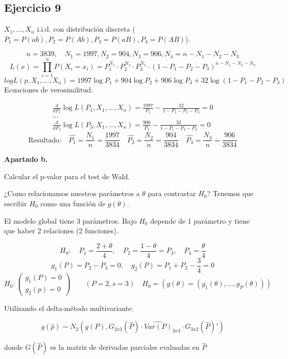 \subsection*{Ejercicio 9}

$X_1,\dots,X_n$ i.i.d. con distribución discreta ($P_1=P(ab),P_2=P(Ab),P_3=P(aB),P_4=P(AB)$).

\[
n=3839, \quad N_1=1997,N_2=904, N_3=906, N_4=n-N_1-N_2-N_3
\]
\[
L(x)=\prod_{i=1}^{n}P(X_i=x_i)=P_1^{N_1}\cdot P_2^{N_2}\cdot P_3^{N_3}\cdot (1-P_1-P_2-P_3)^{n-N_1-N_2-N_3}
\]
\[
log L(p,X_1,\dots,X_n)=1997 \log P_1+ 904 \log P_2+906 \log P_3+32\log(1-P_1-P_2-P_3)
\]
\newpage
Ecuaciones de verosimilitud:

\[
\begin{matrix}
    \frac{d}{d P_1} \log L(P_1, X_1, \dots, X_n) = \frac{1997}{P_1} - \frac{32}{1 - P_1 - P_2 - P_3} = 0 \\[1em]
    \dots \\[1em]
    \frac{d}{d P_3} \log L(P_3, X_1, \dots, X_n) = \frac{906}{P_3} - \frac{32}{1 - P_1 - P_2 - P_3} = 0
\end{matrix}
\]
\[
    \text{Resultado:}\quad \widehat{P_1}=\frac{N_1}{n}=\frac{1997}{3834} \quad \widehat{P_2}=\frac{N_2}{n}=\frac{904}{3834} \quad \widehat{P_3}=\frac{N_3}{n}=\frac{906}{3834}
\]

\textbf{Apartado b.}

Calcular el p-valor para el test de Wald.

¿Como relacionamos nuestros parámetros a $\theta$ para contrastar $H_0$? Tenemos que escribir $H_0$ como una función de $g(\theta)$.

El modelo global tiene 3 parámetros. Bajo $H_0$ depende de 1 parámetro y tiene que haber 2 relaciones (2 funciones).

\[
H_0: \quad P_1=\frac{2+\theta}{4}, \quad P_2=\frac{1-\theta}{4}=P_3, \quad P_4=\frac{\theta}{4}
\]\[g_1(P)=P_2-P_3=0, \quad g_2(P)=P_1+P_2-\frac{3}{4}=0
\]\[H_0:
\begin{pmatrix}
    g_1(P)=0 \\
    g_2(p)=0
\end{pmatrix} \qquad (P=2,s=3) \quad H_0=(g(\theta)=(g_1(\theta),\dots,g_P(\theta)))
\]

Utilizando el delta-método multivariante:

\[
g(\widehat{p})\sim N_2(g(P),G_{2x3}(\widehat{P})\cdot \widehat{Var(P)}_{3x3} \cdot G_{3x2}(\widehat{P})')
\]

donde $G(\widehat{P})$ es la matriz de derivadas parciales evaluadas en $\widehat{P}$

